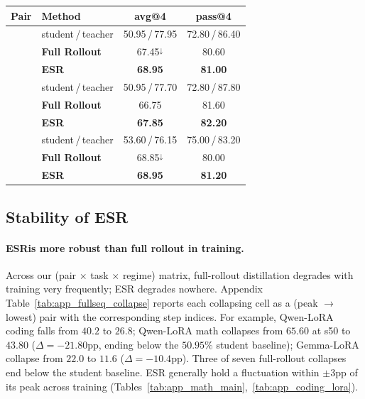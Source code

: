 \documentclass{article}
\newcommand{\method}{ESR}
\newcommand{\Method}{ESR}
\begin{document}
\begin{table}[t]
\begin{minipage}[t]{0.48\textwidth}
\end{minipage}%
\hfill
\begin{minipage}[t]{0.50\textwidth}
\centering
\scriptsize
\setlength{\tabcolsep}{3pt}
\begin{tabular}{@{}l l c c@{}}
\toprule
\textbf{Pair} & \textbf{Method} & \textbf{avg@4} & \textbf{pass@4} \\
\midrule
{} & student\,/\,teacher & 50.95\,/\,77.95 & 72.80\,/\,86.40 \\
 & \textbf{Full Rollout} & 67.45$^{\downarrow}$ & 80.60 \\
 & \textbf{\Method{}} & \textbf{68.95} & \textbf{81.00} \\
\midrule
{} & student\,/\,teacher & 50.95\,/\,77.70 & 72.80\,/\,87.80 \\
 & \textbf{Full Rollout} & 66.75 & 81.60 \\
 & \textbf{\Method{}} & \textbf{67.85} & \textbf{82.20} \\
\midrule
{} & student\,/\,teacher & 53.60\,/\,76.15 & 75.00\,/\,83.20 \\
 & \textbf{Full Rollout} & 68.85$^{\downarrow}$ & 80.00 \\
 & \textbf{\Method{}} & \textbf{68.95} & \textbf{81.20} \\
\bottomrule
\end{tabular}
\end{minipage}
\end{table}


\subsection{Stability of \Method{}}
\label{sec:stability}

\paragraph{\boldmath\method  is more robust than full rollout in training.} Across our (pair $\times$ task $\times$ regime) matrix, full-rollout distillation degrades with training very frequently; \method{} degrades nowhere. Appendix Table~\ref{tab:app_fullseq_collapse} reports each collapsing cell as a (peak $\rightarrow$ lowest) pair with the corresponding step indices. For example, Qwen-LoRA coding falls from $40.2$ to $26.8$; Qwen-LoRA math collapses from $65.60$ at s50 to $43.80$  ($\Delta = -21.80$pp, ending below the $50.95\%$ student baseline); Gemma-LoRA collapse from $22.0$ to $11.6$ ($\Delta = -10.4$pp). Three of seven full-rollout collapses end below the student baseline. \Method{} generally hold a fluctuation within $\pm 3$pp of its peak across training (Tables~\ref{tab:app_math_main},~\ref{tab:app_coding_lora}).
\end{document}
